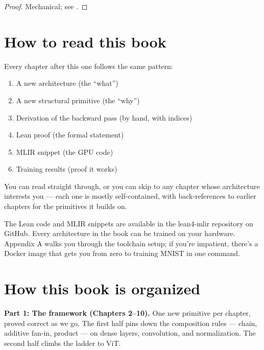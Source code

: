 \begin{proof}
\leanok
Mechanical; see .
\end{proof}

\section*{How to read this book}

Every chapter after this one follows the same pattern:

\begin{enumerate}
  \item A new architecture (the ``what'')
  \item A new structural primitive (the ``why'')
  \item Derivation of the backward pass (by hand, with indices)
  \item Lean proof (the formal statement)
  \item MLIR snippet (the GPU code)
  \item Training results (proof it works)
\end{enumerate}

You can read straight through, or you can skip to any chapter whose
architecture interests you --- each one is mostly self-contained, with
back-references to earlier chapters for the primitives it builds on.

The Lean code and MLIR snippets are available in the lean4-mlir
repository on GitHub. Every architecture in the book can be trained
on your hardware. Appendix A walks you through the toolchain setup;
if you're impatient, there's a Docker image that gets you from zero
to training MNIST in one command.

\section*{How this book is organized}

\textbf{Part 1: The framework (Chapters 2--10).} One new primitive per
chapter, proved correct as we go. The first half pins down the
composition rules --- chain, additive fan-in, product --- on dense
layers, convolution, and normalization. The second half climbs the
ladder to ViT.

